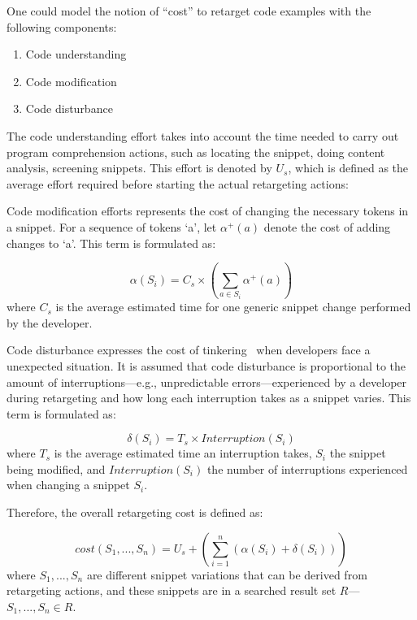 One could model the notion of ``cost'' to retarget code examples with the following components:

\begin{enumerate}
	\item Code understanding
	\item Code modification
	\item Code disturbance
\end{enumerate}
 
The code understanding effort takes into account the time needed to carry out program comprehension actions, such as locating the snippet, doing content analysis, screening snippets. This effort is denoted by $U_{s}$, which is defined as the average effort required before starting the actual retargeting actions:

Code modification efforts represents the cost of changing the necessary tokens in a snippet. For a sequence of tokens `a', let $\alpha^{+}(a)$ denote the cost of adding changes to `a'. This term is formulated as: 

\begin{equation}
	\alpha(S_{i}) = C_{s} \times (\sum_{a \in S_{i}}\alpha^{+}(a))
	\label{costmodification}
\end{equation} where $C_{s}$ is the average estimated time for one generic snippet change performed by the developer.

Code disturbance expresses the cost of tinkering~\cite{Jadud:2006ir} when developers face a unexpected situation. It is assumed that code disturbance is proportional to the amount of interruptions---e.g., unpredictable errors---experienced by a developer during retargeting and how long each interruption takes as a snippet varies. This term is formulated as:

\begin{equation}
	\delta(S_{i}) = T_{s} \times Interruption(S_i)
	\label{costmodification}
\end{equation} where $T_{s}$ is the average estimated time an interruption takes, $S_i$ the snippet being modified, and $Interruption(S_i)$ the number of interruptions experienced when changing a snippet $S_i$. 

Therefore, the overall retargeting cost is defined as:

\begin{equation}
	cost(S_1, ..., S_n) = U_s + (\sum_{i=1}^{n}(\alpha(S_{i}) + \delta(S_{i})))
	\label{totalWork}
\end{equation} where $S_1, ..., S_n$ are different snippet variations that can be derived from retargeting actions, and these snippets are in a searched result set $R$---$S_1, ..., S_n \in R$.   

